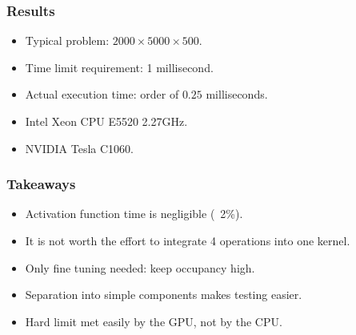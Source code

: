 \begin{frame}
      \frametitle{Results}
\begin{itemize}
\item Typical problem: \(2000\times5000\times 500\).
\item Time limit requirement: 1 millisecond.
\item Actual execution time: order of \(0.25\) milliseconds.
\item Intel Xeon CPU E5520 2.27GHz.
\item NVIDIA Tesla C1060.
\end{itemize}
\end{frame}

\begin{frame}
      \frametitle{Takeaways}
\begin{itemize}
\item Activation function time is negligible (~2\%).
\item It is not worth the effort to integrate 4 operations into one kernel.
\item Only fine tuning needed: keep occupancy high.
\item Separation into simple components makes testing easier.
\item Hard limit met easily by the GPU, not by the CPU.
\end{itemize}
\end{frame}



